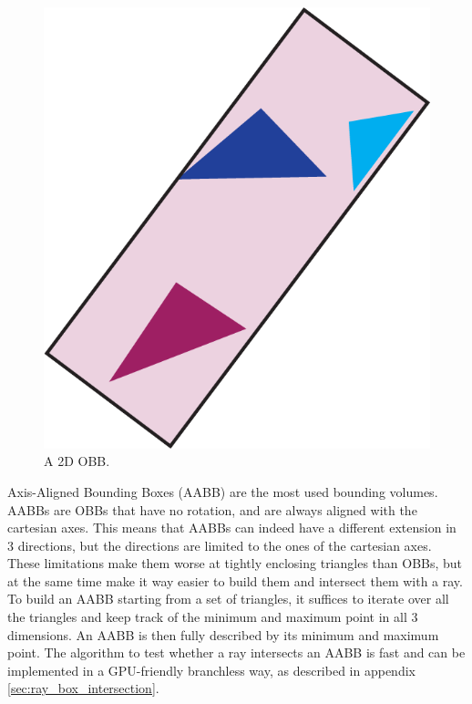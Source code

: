 \documentclass{PoliMi_MasterThesis}
\begin{document}
\begin{figure}[H]
    \centering
    \includegraphics[width=\textwidth*\real{0.3}]{Images/obb_slack.png}
    \caption{A 2D OBB.}
    \label{fig:obb}
\end{figure}

Axis-Aligned Bounding Boxes (AABB) are the most used bounding volumes. AABBs are OBBs that have no rotation, and are always aligned with the cartesian axes. This means that AABBs can indeed have a different extension in 3 directions, but the directions are limited to the ones of the cartesian axes. These limitations make them worse at tightly enclosing triangles than OBBs, but at the same time make it way easier to build them and intersect them with a ray. To build an AABB starting from a set of triangles, it suffices to iterate over all the triangles and keep track of the minimum and maximum point in all 3 dimensions. An AABB is then fully described by its minimum and maximum point. The algorithm to test whether a ray intersects an AABB is fast and can be implemented in a GPU-friendly branchless way, as described in appendix \ref{sec:ray_box_intersection}.
\end{document}

